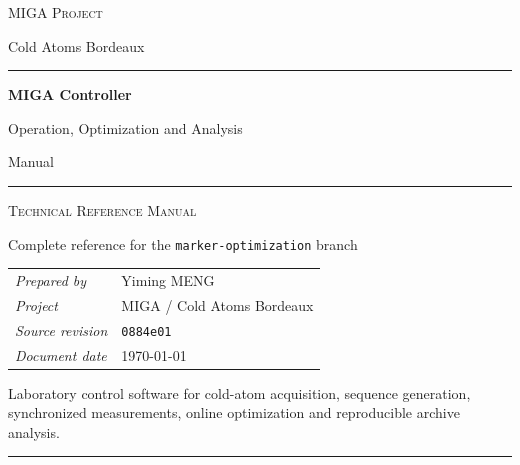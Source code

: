 \documentclass[11pt,oneside,openany]{book}
\newcommand{\branchname}{\texttt{marker-optimization}}
\newcommand{\commitid}{\texttt{0884e01}}
\begin{document}
\begin{titlepage}
  \thispagestyle{empty}
  \centering

  \vspace*{13mm}
  {\large\scshape MIGA Project\par}
  \vspace{2mm}
  {\normalsize Cold Atoms Bordeaux\par}

  \vspace{22mm}
  {\color{MigaNavy}\rule{0.78\textwidth}{0.8pt}\par}
  \vspace{12mm}

  {\color{MigaNavy}\bfseries\fontsize{31}{37}\selectfont
    MIGA Controller\par}
  \vspace{8mm}
  {\Large Operation, Optimization and Analysis\par}
  \vspace{3mm}
  {\Large Manual\par}

  \vspace{12mm}
  {\color{MigaNavy}\rule{0.78\textwidth}{0.8pt}\par}
  \vspace{10mm}
  {\large\scshape Technical Reference Manual\par}
  \vspace{3mm}
  {\normalsize Complete reference for the \branchname{} branch\par}

  \vfill

  \begin{tabular}{>{\raggedleft\arraybackslash}p{34mm} p{64mm}}
    \textit{Prepared by} & Yiming MENG\\[3mm]
    \textit{Project} & MIGA / Cold Atoms Bordeaux\\[3mm]
    \textit{Source revision} & \commitid\\[3mm]
    \textit{Document date} & \today
  \end{tabular}

  \vfill

  \begin{minipage}{0.78\textwidth}
    \centering
    \small\color{MigaGray}
    Laboratory control software for cold-atom acquisition, sequence generation,
    synchronized measurements, online optimization and reproducible archive analysis.
  \end{minipage}

  \vspace{9mm}
  {\color{MigaNavy!45}\rule{0.42\textwidth}{0.45pt}\par}
  \vspace*{5mm}
\end{titlepage}
\color{black}
\end{document}
